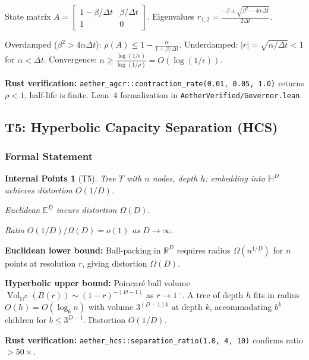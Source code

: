 \documentclass[11pt, a4paper]{article}
\theoremstyle{proofform}
\newtheorem{innerpoints}{Internal Points}
\numberwithin{innerpoints}{subsection}
\numberwithin{disproof}{subsection}
\theoremstyle{mathproof}
\begin{document}
\begin{Proof}
State matrix $A = \begin{bmatrix} 1 - \beta/\Delta t & \beta/\Delta t \\ 1 & 0 \end{bmatrix}$. Eigenvalues $r_{1,2} = \frac{-\beta \pm \sqrt{\beta^2 - 4\alpha\Delta t}}{2\Delta t}$.

Overdamped ($\beta^2 > 4\alpha\Delta t$): $\rho(A) \leq 1 - \frac{\alpha}{1 + \beta/\Delta t}$. Underdamped: $|r| = \sqrt{\alpha/\Delta t} < 1$ for $\alpha < \Delta t$. Convergence: $n \geq \frac{\log(1/\epsilon)}{\log(1/\rho)} = O(\log(1/\epsilon))$.

\textbf{Rust verification:} \texttt{aether\_agcr::contraction\_rate(0.01, 0.05, 1.0)} returns $\rho < 1$, half-life is finite. Lean~4 formalization in \texttt{AetherVerified/Governor.lean}.
\end{Proof}

\subsection{T5: Hyperbolic Capacity Separation (HCS)}
\label{sec:hcs}

\subsubsection*{Formal Statement}
\begin{innerpoints}[T5]
\item Tree $T$ with $n$ nodes, depth $h$: embedding into $\mathbb{H}^D$ achieves distortion $O(1/D)$.
\item Euclidean $\mathbb{E}^D$ incurs distortion $\Omega(D)$.
\item Ratio $O(1/D)/\Omega(D) = o(1)$ as $D \to \infty$.
\end{innerpoints}

\begin{Proof}
\textbf{Euclidean lower bound:} Ball-packing in $\mathbb{R}^D$ requires radius $\Omega(n^{1/D})$ for $n$ points at resolution $r$, giving distortion $\Omega(D)$.

\textbf{Hyperbolic upper bound:} Poincar\'e ball volume $\operatorname{Vol}_{\mathbb{H}^D}(B(r)) \sim (1-r)^{-(D-1)}$ as $r \to 1^-$. A tree of depth $h$ fits in radius $O(h) = O(\log_b n)$ with volume $3^{(D-1)k}$ at depth $k$, accommodating $b^k$ children for $b \leq 3^{D-1}$. Distortion $O(1/D)$.

\textbf{Rust verification:} \texttt{aether\_hcs::separation\_ratio(1.0, 4, 10)} confirms ratio $> 50\times$.
\end{Proof}
\end{document}
